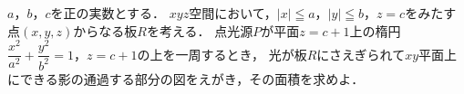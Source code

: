 \documentclass[../../main.tex]{subfiles}
\begin{document}
$a$，$b$，$c$を正の実数とする．
$xyz$空間において，$|x|\leqq a$，$|y|\leqq b$，$z=c$をみたす点$(x,y,z)$からなる板$R$を考える．
点光源$P$が平面$z=c+1$上の楕円$\displaystyle\dfrac{x^2}{a^2}+\dfrac{y^2}{b^2}=1$，$z=c+1$の上を一周するとき，
光が板$R$にさえぎられて$xy$平面上にできる影の通過する部分の図をえがき，その面積を求めよ．
\end{document}
